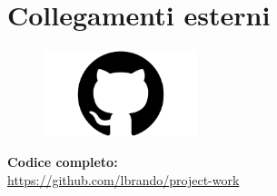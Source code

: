 \documentclass{article}
\begin{document}
\section{Collegamenti esterni}
	\begin{figure}[H]
	\centering
	\includegraphics[width=0.4\textwidth]{immagini/github}
\end{figure}
	\begin{flushleft}
	\textbf{Codice completo:}\\
	\href{https://github.com/lbrando/project-work}{https://github.com/lbrando/project-work}
\end{flushleft}
\end{document}
